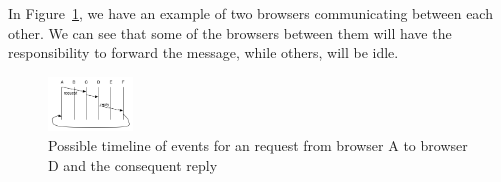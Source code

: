 In Figure~\ref{fig:t-f-2}, we have an example of two browsers communicating between each other. We can see that some of the browsers between them will have the responsibility to forward the message, while others, will be idle.

\begin{figure}[h!]
  \centering
  \includegraphics[width=0.2\textwidth]{figs/testing-framework-2}
  \caption{Possible timeline of events for an request from browser A to browser D and the consequent reply}
  \label{fig:t-f-2}
\end{figure}

